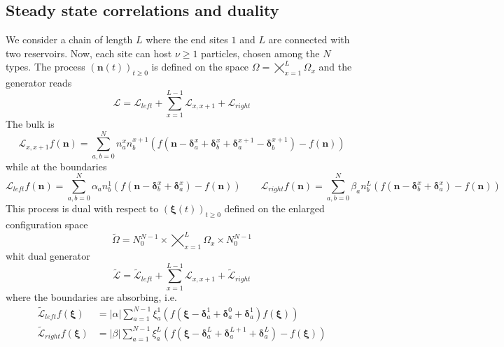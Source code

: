 \documentclass[10pt]{article}
\numberwithin{equation}{section}
\numberwithin{equation}{subsection}
\begin{document}
\subsection{Steady state correlations and duality}\label{Subsection-ss-nonI}
We consider a chain of length $L$ where the end sites $1$ and $L$ are connected with two reservoirs. Now, each site can host $\nu\geq 1$ particles, chosen among the $N$ types. The process $\left(\bm{n}(t)\right)_{t\geq0}$ is defined on the space $\Omega=\bigtimes_{x=1}^{L} \Omega_{x}$ and the generator reads
\begin{equation}
	\mathcal{L}=\mathcal{L}_{left}+\sum_{x=1}^{L-1}\mathcal{L}_{x,x+1}+\mathcal{L}_{right}
\end{equation} 
The bulk is 
\begin{equation}
	\mathcal{L}_{x,x+1}f(\bm{n})=\sum_{a,b=0}^{N}n_{a}^{x}n_{b}^{x+1}\left(f(\bm{n}-\bm{\delta}_{a}^{x}+\bm{\delta}_{b}^{x}+\bm{\delta}_{a}^{x+1}-\bm{\delta}_{b}^{x+1})-f(\bm{n})\right)
\end{equation}
while at the boundaries 
\begin{equation}
	\mathcal{L}_{left}f(\bm{n})=\sum_{a,b=0}^{N}\alpha_{a}n_{b}^{1}\left(f(\bm{n}-\bm{\delta}_{b}^{x}+\bm{\delta}_{a}^{x})-f(\bm{n})\right)\qquad \mathcal{L}_{right}f(\bm{n})=\sum_{a,b=0}^{N}\beta_{a}n_{b}^{L}\left(f(\bm{n}-\bm{\delta}_{b}^{x}+\bm{\delta}_{a}^{x})-f(\bm{n})\right)
\end{equation}
This process is dual with respect to $(\bm{\xi}(t))_{t\geq0} $ defined on the enlarged configuration space
 \begin{equation}	
	\widetilde{\Omega}=N_{0}^{N-1}\times\bigtimes_{x=1}^{L} \Omega_{x}\times N_{0}^{N-1}
\end{equation}
whit dual generator
\begin{equation}
	\widetilde{\mathcal{L}}=\widetilde{\mathcal{L}}_{left}+\sum_{x=1}^{L-1}\mathcal{L}_{x,x+1}+\widetilde{\mathcal{L}}_{right}
\end{equation} 
where the boundaries are absorbing, i.e. 
\begin{equation}
	\begin{split}
		\widetilde{\mathcal{L}}_{left}f(\bm{\xi})&=|\alpha|\sum_{a=1}^{N-1}\xi_{a}^{1}\left(f(\bm{\xi}-\bm{\delta}_{a}^{1}+\bm{\delta}_{a}^{0}+\bm{\delta}_{a}^{1})f(\bm{\xi})\right)\\\widetilde{\mathcal{L}}_{right}f(\bm{\xi})&=|\beta|\sum_{a=1}^{N-1}\xi_{a}^{L}\left(f(\bm{\xi}-\bm{\delta}_{a}^{L}+\bm{\delta}_{a}^{L+1}+\bm{\delta}_{a}^{L})-f(\bm{\xi})\right)
	\end{split}
\end{equation}
\end{document}

